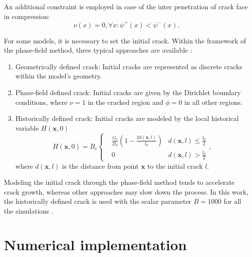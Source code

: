 \documentclass[final,times,fleqn,11pt]{elsarticle}
\begin{document}
An additional constraint is employed in case of the inter penetration of crack face in compression:
\begin{equation}
     \nu(x)=0, \forall x: \psi^+(x)<\psi^-(x).
\end{equation}

For some models, it is necessary to set the initial crack. Within the framework of the phase-field method, three typical approaches are available \cite{sargado_high-accuracy_2018}: 
\begin{enumerate}
    \item Geometrically defined crack: Initial cracks are represented as discrete cracks within the model's geometry.
    \item Phase-field defined crack: Initial cracks are given by the Dirichlet boundary conditions, where $\nu=1$ in the cracked region and $\phi=0$ in all other regions. 
    \item Historically defined crack: Initial cracks are modeled by the local historical variable $H(\mathbf{x},0)$
    \begin{equation}\label{historical variable}
        H(\mathbf{x},0)=B_c\left\{ 
            \begin{aligned}
                &\frac{G_c}{2l_0}(1-\frac{2d(\mathbf{x},l)}{l_0}) & d(\mathbf{x},l)\leq \frac{l_0}{2} \\
                &0 & d(\mathbf{x},l) > \frac{l_0}{2}
            \end{aligned}
         \right.,
    \end{equation}
    where $d(\mathbf{x},l)$ is the distance from point $\mathbf{x}$ to the initial crack $l$.
\end{enumerate}

Modeling the initial crack through the phase-field method tends to accelerate crack growth, whereas other approaches may slow down the process. In this work, the historically defined crack is used with the scalar parameter $B=1000$ for all the simulations \cite{borden_phase-field_2012}.

\section{Numerical implementation}\label{Section3}
\end{document}

